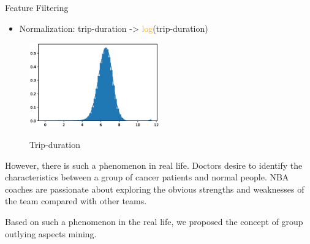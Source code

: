 \documentclass[
 size=14pt,
 paper=smartboard,  %
 mode=present, 		%
 display=slides, 	%
 style=tuliplab,  	%
 pauseslide,
 fleqn,leqno]{powerdot}
\begin{document}

\begin{slide}[toc=,bm=]{Feature Filtering}

\begin{itemize}
\item
Normalization: trip-duration -> \textcolor{orange}{log}(trip-duration)
\end{itemize}

\begin{figure}
  \centering
   \includegraphics[width=0.5\textwidth]{figure//fig-5.eps}\\
  \caption{Trip-duration}\label{fig:demical}
\end{figure}


\begin{note}
However,
there is such a phenomenon in real life.
Doctors desire to identify the characteristics between
a group of cancer patients and normal people.
NBA coaches are passionate about exploring the obvious strengths and
weaknesses of the team compared with other teams.

Based on such a phenomenon in the real life,
we proposed the concept of group outlying aspects mining.
\end{note}

\end{slide}

\end{document}
